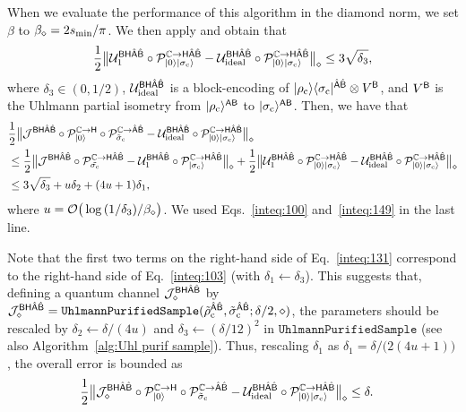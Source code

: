 When we evaluate the performance of this algorithm in the diamond norm, we set $\beta$ to $\beta_\diamond = 2s_{\rm min}/\pi$. We then apply  and obtain that
\begin{align}
\label{inteq:149}
    \frac{1}{2}\big\|{\mathcal{U}}_1^{{\mathsf{B}}{\mathsf{H}}\hat{{\mathsf{A}}}\hat{{\mathsf{B}}}}\circ{\mathcal{P}}_{|0\rangle|\sigma_{\rm c}\rangle}^{\mathbb{C}\rightarrow{\mathsf{H}}\hat{{\mathsf{A}}}\hat{{\mathsf{B}}}} - {\mathcal{U}}_{\rm ideal}^{{\mathsf{B}}{\mathsf{H}}\hat{{\mathsf{A}}}\hat{{\mathsf{B}}}}\circ{\mathcal{P}}_{|0\rangle|\sigma_{\rm c}\rangle}^{\mathbb{C}\rightarrow{\mathsf{H}}\hat{{\mathsf{A}}}\hat{{\mathsf{B}}}}\big\|_\diamond \leq 3\sqrt{\delta_3},
\end{align}
where $\delta_3 \in (0, 1/2)$, ${\mathcal{U}}_{\rm ideal}^{{\mathsf{B}}{\mathsf{H}}\hat{{\mathsf{A}}}\hat{{\mathsf{B}}}}$ is a block-encoding of $|\rho_{\rm c}\rangle\langle\sigma_{\rm c}|^{\hat{{\mathsf{A}}}\hat{{\mathsf{B}}}} \otimes V^{\mathsf{B}}$, and $V^{\mathsf{B}}$ is the Uhlmann partial isometry from $|\rho_{\rm c}\rangle^{{\mathsf{A}}{\mathsf{B}}}$ to $|\sigma_{\rm c}\rangle^{{\mathsf{A}}{\mathsf{B}}}$.
Then, we have that 
\begin{align}
    &\frac{1}{2}\big\|{\mathcal{J}}^{{\mathsf{B}}{\mathsf{H}}\hat{{\mathsf{A}}}\hat{{\mathsf{B}}}}\circ{\mathcal{P}}_{|0\rangle}^{\mathbb{C}\rightarrow{\mathsf{H}}}\circ{\mathcal{P}}_{\tilde{\sigma}_{\rm c}}^{\mathbb{C}\rightarrow\hat{{\mathsf{A}}}\hat{{\mathsf{B}}}} - {\mathcal{U}}_{\rm ideal}^{{\mathsf{B}}{\mathsf{H}}\hat{{\mathsf{A}}}\hat{{\mathsf{B}}}}\circ{\mathcal{P}}_{|0\rangle|\sigma_{\rm c}\rangle}^{\mathbb{C}\rightarrow{\mathsf{H}}\hat{{\mathsf{A}}}\hat{{\mathsf{B}}}}\big\|_\diamond \notag\\
    &\leq \frac{1}{2}\big\|{\mathcal{J}}^{{\mathsf{B}}{\mathsf{H}}\hat{{\mathsf{A}}}\hat{{\mathsf{B}}}}\circ{\mathcal{P}}_{\tilde{\sigma_{\rm c}}}^{\mathbb{C}\rightarrow{\mathsf{H}}\hat{{\mathsf{A}}}\hat{{\mathsf{B}}}} - {\mathcal{U}}_1^{{\mathsf{B}}{\mathsf{H}}\hat{{\mathsf{A}}}\hat{{\mathsf{B}}}}\circ{\mathcal{P}}_{|\sigma_{\rm c}\rangle}^{\mathbb{C}\rightarrow{\mathsf{H}}\hat{{\mathsf{A}}}\hat{{\mathsf{B}}}}\big\|_\diamond + \frac{1}{2}\big\|{\mathcal{U}}_1^{{\mathsf{B}}{\mathsf{H}}\hat{{\mathsf{A}}}\hat{{\mathsf{B}}}}\circ{\mathcal{P}}_{|0\rangle|\sigma_{\rm c}\rangle}^{\mathbb{C}\rightarrow{\mathsf{H}}\hat{{\mathsf{A}}}\hat{{\mathsf{B}}}} - {\mathcal{U}}_{\rm ideal}^{{\mathsf{B}}{\mathsf{H}}\hat{{\mathsf{A}}}\hat{{\mathsf{B}}}}\circ{\mathcal{P}}_{|0\rangle|\sigma_{\rm c}\rangle}^{\mathbb{C}\rightarrow{\mathsf{H}}\hat{{\mathsf{A}}}\hat{{\mathsf{B}}}}\big\|_\diamond \\
    \label{inteq:131}
    &\leq  3\sqrt{\delta_3} + u\delta_2 + (4u + 1)\delta_1,
\end{align}
where $u={\mathcal{O}}\big(\log{(1/\delta_3)/\beta_\diamond}\big)$. 
We used Eqs.~\eqref{inteq:100} and~\eqref{inteq:149} in the last line.

Note that the first two terms on the right-hand side of Eq.~\eqref{inteq:131} correspond to the right-hand side of Eq.~\eqref{inteq:103} (with $\delta_1 \gets \delta_3$).
This suggests that, defining a quantum channel ${\mathcal{J}}_\diamond^{{\mathsf{B}}{\mathsf{H}}\hat{{\mathsf{A}}}\hat{{\mathsf{B}}}}$ by ${\mathcal{J}}_\diamond^{{\mathsf{B}}{\mathsf{H}}\hat{{\mathsf{A}}}\hat{{\mathsf{B}}}} = \mathtt{UhlmannPurifiedSample}(\tilde{\rho}_{\rm c}^{\hat{{\mathsf{A}}}\hat{{\mathsf{B}}}}, \tilde{\sigma}_{\rm c}^{\hat{{\mathsf{A}}}\hat{{\mathsf{B}}}}; \delta/2, \diamond)$, the parameters should be rescaled by $\delta_2 \gets \delta/(4u)$ and $\delta_3 \gets (\delta/12)^2$ in $\mathtt{UhlmannPurifiedSample}$ (see also Algorithm~\ref{alg:Uhl purif sample}).
Thus, rescaling $\delta_1$ as $\delta_1 = \delta/\big(2(4u+1)\big)$, the overall error is bounded as
\begin{align}
    &\frac{1}{2}\big\|{\mathcal{J}}_\diamond^{{\mathsf{B}}{\mathsf{H}}\hat{{\mathsf{A}}}\hat{{\mathsf{B}}}}\circ{\mathcal{P}}_{|0\rangle}^{\mathbb{C}\rightarrow{\mathsf{H}}}\circ{\mathcal{P}}_{\tilde{\sigma}_{\rm c}}^{\mathbb{C}\rightarrow\hat{{\mathsf{A}}}\hat{{\mathsf{B}}}} - {\mathcal{U}}_{\rm ideal}^{{\mathsf{B}}{\mathsf{H}}\hat{{\mathsf{A}}}\hat{{\mathsf{B}}}}\circ{\mathcal{P}}_{|0\rangle|\sigma_{\rm c}\rangle}^{\mathbb{C}\rightarrow{\mathsf{H}}\hat{{\mathsf{A}}}\hat{{\mathsf{B}}}}\big\|_\diamond \leq \delta.
\end{align}

